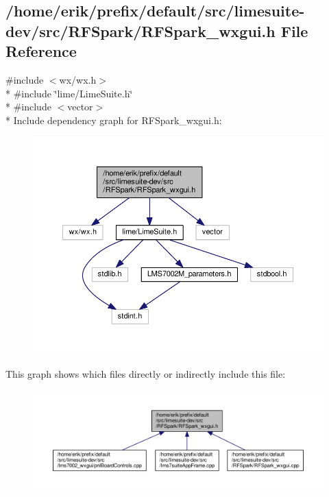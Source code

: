 \subsection{/home/erik/prefix/default/src/limesuite-\/dev/src/\+R\+F\+Spark/\+R\+F\+Spark\+\_\+wxgui.h File Reference}
\label{RFSpark__wxgui_8h}
{\ttfamily \#include $<$wx/wx.\+h$>$}\\*
{\ttfamily \#include \char`\"{}lime/\+Lime\+Suite.\+h\char`\"{}}\\*
{\ttfamily \#include $<$vector$>$}\\*
Include dependency graph for R\+F\+Spark\+\_\+wxgui.\+h\+:
\nopagebreak
\begin{figure}[H]
\begin{center}
\leavevmode
\includegraphics[width=350pt]{d2/df3/RFSpark__wxgui_8h__incl}
\end{center}
\end{figure}
This graph shows which files directly or indirectly include this file\+:
\nopagebreak
\begin{figure}[H]
\begin{center}
\leavevmode
\includegraphics[width=350pt]{de/d76/RFSpark__wxgui_8h__dep__incl}
\end{center}
\end{figure}
